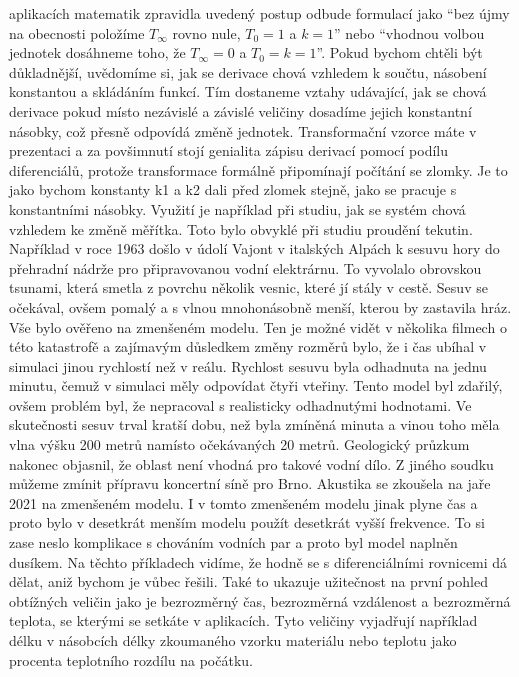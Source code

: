 aplikacích matematik zpravidla uvedený postup odbude formulací jako ``bez újmy na obecnosti položíme $T_\infty$ rovno nule, $T_0=1$ a $k=1$'' nebo ``vhodnou volbou jednotek dosáhneme toho, že $T_\infty=0$ a $T_0=k=1$''. Pokud bychom chtěli být důkladnější, uvědomíme si, jak se derivace chová vzhledem k součtu, násobení konstantou a skládáním funkcí. Tím dostaneme vztahy udávající, jak se chová derivace pokud místo nezávislé a závislé veličiny dosadíme jejich konstantní násobky, což přesně odpovídá změně jednotek. Transformační vzorce máte v prezentaci a za povšimnutí stojí genialita zápisu derivací pomocí podílu diferenciálů, protože transformace formálně připomínají počítání se zlomky. Je to jako bychom konstanty k1 a k2 dali před zlomek stejně, jako se pracuje s konstantními násobky. Využití je například při studiu, jak se systém chová vzhledem ke změně měřítka. Toto bylo obvyklé při studiu proudění tekutin. Například v  roce 1963 došlo v údolí Vajont v italských Alpách k sesuvu hory do přehradní nádrže pro připravovanou vodní elektrárnu. To vyvolalo obrovskou tsunami, která smetla z povrchu několik vesnic, které jí stály v cestě. Sesuv se očekával, ovšem pomalý a s vlnou mnohonásobně menší, kterou by zastavila hráz. Vše bylo ověřeno na zmenšeném modelu. Ten je možné vidět v několika filmech o této katastrofě a zajímavým důsledkem změny rozměrů bylo, že i čas ubíhal v simulaci jinou rychlostí než v reálu. Rychlost sesuvu byla odhadnuta na jednu minutu, čemuž v simulaci měly odpovídat čtyři vteřiny. Tento model byl zdařilý, ovšem problém byl, že nepracoval s realisticky odhadnutými hodnotami. Ve skutečnosti sesuv trval kratší dobu, než byla zmíněná minuta a vinou toho měla vlna výšku 200 metrů namísto očekávaných 20 metrů. Geologický průzkum nakonec objasnil, že oblast není vhodná pro takové vodní dílo. Z jiného soudku můžeme zmínit přípravu koncertní síně pro Brno. Akustika se zkoušela na jaře 2021 na zmenšeném modelu. I v tomto zmenšeném modelu jinak plyne čas a proto bylo v desetkrát menším modelu použít desetkrát vyšší frekvence. To si zase neslo komplikace s chováním vodních par a proto byl model naplněn dusíkem. Na těchto příkladech vidíme, že hodně se s diferenciálními rovnicemi dá dělat, aniž bychom je vůbec řešili. Také to ukazuje užitečnost na první pohled obtížných veličin jako je bezrozměrný čas, bezrozměrná vzdálenost a bezrozměrná teplota, se kterými se setkáte v aplikacích. Tyto veličiny vyjadřují například délku v násobcích délky zkoumaného vzorku materiálu nebo teplotu jako procenta teplotního rozdílu na počátku. 




